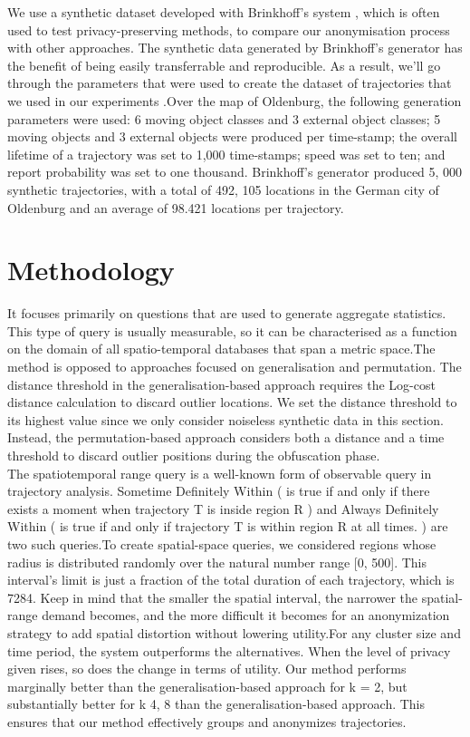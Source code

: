We use a synthetic dataset developed with Brinkhoff's system , which is often used to test privacy-preserving methods, to compare our anonymisation process with other approaches. The synthetic data generated by Brinkhoff's generator has the benefit of being easily transferrable and reproducible. As a result, we'll go through the parameters that were used to create the dataset of trajectories that we used in our experiments \cite{brinkhoff2002framework}.Over the map of Oldenburg, the following generation parameters were used: 6 moving object classes and 3 external object classes; 5 moving objects and 3 external objects were produced per time-stamp; the overall lifetime of a trajectory was set to 1,000 time-stamps; speed was set to ten; and report probability was set to one thousand. Brinkhoff's generator produced 5, 000 synthetic trajectories, with a total of 492, 105 locations in the German city of Oldenburg and an average of 98.421 locations per trajectory.

\section{Methodology}
It focuses primarily on questions that are used to generate aggregate statistics.
This type of query is usually measurable, so it can be characterised as a function on the domain of all spatio-temporal databases that span a metric space.The method is opposed to approaches focused on generalisation and permutation. The distance threshold in the generalisation-based approach requires the Log-cost distance calculation to discard outlier locations. We set the distance threshold to its highest value since we only consider noiseless synthetic data in this section. Instead, the permutation-based approach considers both a distance and a time threshold to discard outlier positions during the obfuscation phase.\\
The spatiotemporal range query is a well-known form of observable query in trajectory analysis. Sometime Definitely Within ( is true if and only if there exists a moment when trajectory T is inside region R ) and Always Definitely Within ( is true if and only if trajectory T is within region R at all times. ) are two such queries.To create spatial-space queries, we considered regions whose radius is distributed randomly over the natural number range [0, 500]. This interval's limit is just a fraction of the total duration of each trajectory, which is 7284. Keep in mind that the smaller the spatial interval, the narrower the spatial-range demand becomes, and the more difficult it becomes for an anonymization strategy to add spatial distortion without lowering utility.For any cluster size and time period, the system outperforms the alternatives. When the level of privacy given rises, so does the change in terms of utility. Our method performs marginally better than the generalisation-based approach for k = 2, but substantially better for k 4, 8 than the generalisation-based approach. This ensures that our method effectively groups and anonymizes trajectories.